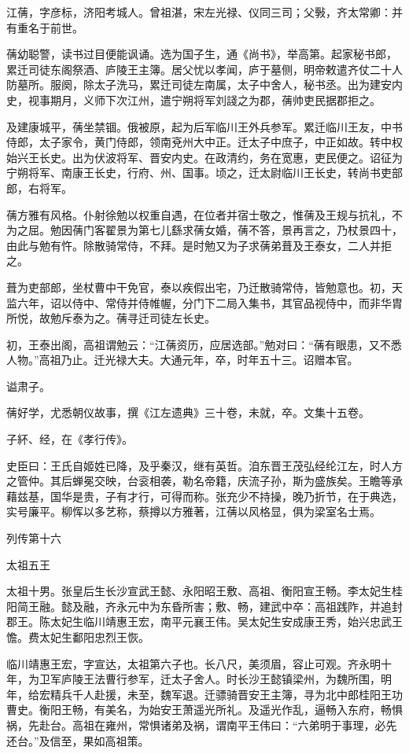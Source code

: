 \documentclass[12pt,UTF8]{ctexbook}
\begin{document}
江蒨，字彦标，济阳考城人。曾祖湛，宋左光禄、仪同三司；父斅，齐太常卿：并有重名于前世。

蒨幼聪警，读书过目便能讽诵。选为国子生，通《尚书》，举高第。起家秘书郎，累迁司徒东阁祭酒、庐陵王主簿。居父忧以孝闻，庐于墓侧，明帝敕遣齐仗二十人防墓所。服阕，除太子洗马，累迁司徒左南属，太子中舍人，秘书丞。出为建安内史，视事期月，义师下次江州，遣宁朔将军刘諓之为郡，蒨帅吏民据郡拒之。

及建康城平，蒨坐禁锢。俄被原，起为后军临川王外兵参军。累迁临川王友，中书侍郎，太子家令，黄门侍郎，领南兗州大中正。迁太子中庶子，中正如故。转中权始兴王长史。出为伏波将军、晋安内史。在政清约，务在宽惠，吏民便之。诏征为宁朔将军、南康王长史，行府、州、国事。顷之，迁太尉临川王长史，转尚书吏部郎，右将军。

蒨方雅有风格。仆射徐勉以权重自遇，在位者并宿士敬之，惟蒨及王规与抗礼，不为之屈。勉因蒨门客翟景为第七儿繇求蒨女婚，蒨不答，景再言之，乃杖景四十，由此与勉有忤。除散骑常侍，不拜。是时勉又为子求蒨弟葺及王泰女，二人并拒之。

葺为吏部郎，坐杖曹中干免官，泰以疾假出宅，乃迁散骑常侍，皆勉意也。初，天监六年，诏以侍中、常侍并侍帷幄，分门下二局入集书，其官品视侍中，而非华胄所悦，故勉斥泰为之。蒨寻迁司徒左长史。

初，王泰出阁，高祖谓勉云：“江蒨资历，应居选部。”勉对曰：“蒨有眼患，又不悉人物。”高祖乃止。迁光禄大夫。大通元年，卒，时年五十三。诏赠本官。

谥肃子。

蒨好学，尤悉朝仪故事，撰《江左遗典》三十卷，未就，卒。文集十五卷。

子紑、经，在《孝行传》。

史臣曰：王氏自姬姓已降，及乎秦汉，继有英哲。洎东晋王茂弘经纶江左，时人方之管仲。其后蝉冕交映，台衮相袭，勒名帝籍，庆流子孙，斯为盛族矣。王瞻等承藉兹基，国华是贵，子有才行，可得而称。张充少不持操，晚乃折节，在于典选，实号廉平。柳恽以多艺称，蔡撙以方雅著，江蒨以风格显，俱为梁室名士焉。





列传第十六

太祖五王

太祖十男。张皇后生长沙宣武王懿、永阳昭王敷、高祖、衡阳宣王畅。李太妃生桂阳简王融。懿及融，齐永元中为东昏所害；敷、畅，建武中卒：高祖践阼，并追封郡王。陈太妃生临川靖惠王宏，南平元襄王伟。吴太妃生安成康王秀，始兴忠武王憺。费太妃生鄱阳忠烈王恢。

临川靖惠王宏，字宣达，太祖第六子也。长八尺，美须眉，容止可观。齐永明十年，为卫军庐陵王法曹行参军，迁太子舍人。时长沙王懿镇梁州，为魏所围，明年，给宏精兵千人赴援，未至，魏军退。迁骠骑晋安王主簿，寻为北中郎桂阳王功曹史。衡阳王畅，有美名，为始安王萧遥光所礼。及遥光作乱，逼畅入东府，畅惧祸，先赴台。高祖在雍州，常惧诸弟及祸，谓南平王伟曰：“六弟明于事理，必先还台。”及信至，果如高祖策。
\end{document}
